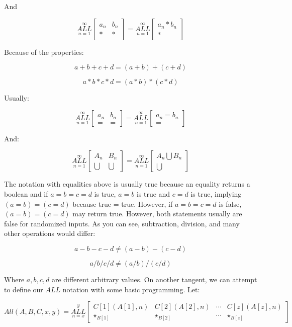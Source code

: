 \documentclass{article}
\begin{document}
And

$$\underset{n=1}{\overset{\infty}{ALL}} \begin{bmatrix}
a_n & b_n \\
*& *
\end{bmatrix} = \underset{n=1}{\overset{\infty}{ALL}} \begin{bmatrix}
a_n * b_n \\
 *
\end{bmatrix}$$

Because of the properties:

$$a+b+c+d=(a+b)+(c+d)$$

$$a*b*c*d=(a*b)*(c*d)$$

Usually:

$$\underset{n=1}{\overset{\infty}{ALL}} \begin{bmatrix}
a_n & b_n \\
=& =
\end{bmatrix} = \underset{n=1}{\overset{\infty}{ALL}} \begin{bmatrix}
a_n = b_n \\
 =
\end{bmatrix}$$

And:

$$\underset{n=1}{\overset{\infty}{ALL}} \begin{bmatrix}
A_n & B_n \\
\bigcup & \bigcup
\end{bmatrix} = \underset{n=1}{\overset{\infty}{ALL}} \begin{bmatrix}
A_n \bigcup B_n \\
 \bigcup
\end{bmatrix}$$

The notation with equalities above is usually true because an equality returns a boolean and if $a=b=c=d$ is true, $a=b$ is true and $c=d$ is true, implying $(a=b)=(c=d)$ because true = true. However, if $a=b=c=d$ is false, $(a=b)=(c=d)$ may return true. However, both statements usually are false for randomized inputs. As you can see, subtraction, division, and many other operations would differ:

$$a-b-c-d \neq (a-b) - (c-d)$$

$$a/b/c/d \neq (a/b)/(c/d)$$

Where $a,b,c,d$ are different arbitrary values. On another tangent, we can attempt to define our $ALL$ notation with some basic programming. Let:

$$All(A, B, C, x, y)=\underset{n=x}{\overset{y}{ALL}} \begin{bmatrix}
C[1](A[1],n) & C[2](A[2],n) & \cdots & C[z](A[z],n) \\
\star_{B[1]}& \star_{B[2]} & \cdots & \star_{B[z]}
\end{bmatrix}$$
\end{document}
